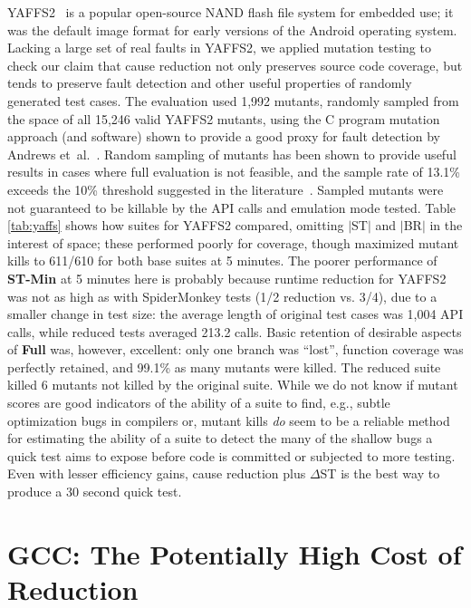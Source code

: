 YAFFS2~\cite{yaffs2} is a popular open-source NAND flash file system
for embedded use; it was the default image format for early versions
of the Android operating system.  Lacking a large set of real faults
in YAFFS2, we applied mutation testing to check our claim that cause
reduction not only preserves source code coverage, but tends to
preserve fault detection and other useful properties of randomly
generated test cases. The evaluation used 1,992 mutants, randomly
sampled from the space of all 15,246 valid YAFFS2 mutants, using the C
program mutation approach (and software) shown to provide a good proxy
for fault detection by Andrews et~al.~\cite{mutant}.  Random sampling
of mutants has been shown to provide useful results in cases where
full evaluation is not feasible, and the sample rate of 13.1\% exceeds
the 10\% threshold suggested in the literature~\cite{MutRand}.
Sampled mutants were not guaranteed to be killable by the API calls
and emulation mode tested.  Table \ref{tab:yaffs} shows how suites for
YAFFS2 compared, omitting $|$ST$|$ and $|$BR$|$ in the interest of
space; these performed poorly for coverage, though maximized mutant
kills to 611/610 for both base suites at 5 minutes.  The poorer
performance of {\bf ST-Min} at 5 minutes here is probably because
runtime reduction for YAFFS2 was not as high as with SpiderMonkey
tests (1/2 reduction vs. 3/4), due to a smaller change in test size:
the average length of original test cases was 1,004 API calls, while
reduced tests averaged 213.2 calls.  Basic retention of desirable
aspects of {\bf Full} was, however, excellent: only one branch was
``lost'', function coverage was perfectly retained, and 99.1\% as many
mutants were killed.  The reduced suite killed 6 mutants not killed by
the original suite.  While we do not know if mutant scores are good
indicators of the ability of a suite to find, e.g., subtle
optimization bugs in compilers or, mutant kills \emph{do} seem to be a
reliable method for estimating the ability of a suite to detect the
many of the shallow bugs a quick test aims to expose before code is
committed or subjected to more testing.  Even with lesser efficiency
gains, cause reduction plus $\Delta$ST is the best way to produce a 30
second quick test.

\section{GCC: The Potentially High Cost of Reduction}

